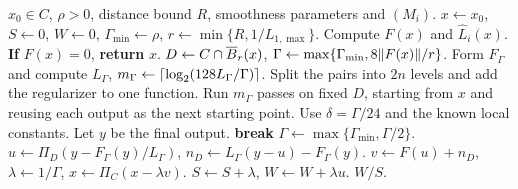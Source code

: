 \begin{algorithm}[htbp]
\caption{Локализованный HPE с внутренним проходом пути А}
\label{alg:hpe}
\begin{algorithmic}[1]
\REQUIRE $x_0\in C$, $\rho>0$, distance bound $R$, smoothness parameters and $(M_i)$.
\STATE $x\gets x_0$, $S\gets0$, $W\gets0$,
  $\Gamma_{\min}\gets\rho$, $r\gets\min\{R,1/L_{1,\max}\}$.
  \STATE Compute $F(x)$ and $\widehat L_i(x)$. \textbf{If} $F(x)=0$, \textbf{return} $x$.
  \STATE $D\gets C\cap\overline B_r(x)$,
     $\Gamma\gets\max\{\Gamma_{\min},8\lVert F(x)\rVert/r\}$.
    \STATE Form $F_\Gamma$ and compute $L_\Gamma$,
       $m_\Gamma\gets\left\lceil \log_2(128L_\Gamma/\Gamma)\right\rceil$.
    \STATE Split the pairs into $2n$ levels and add the regularizer to one function.
    \STATE Run $m_\Gamma$ passes on fixed $D$, starting from $x$ and reusing each output as the next starting point. Use $\delta=\Gamma/24$ and the known local constants. Let $y$ be the final output.
      \STATE \textbf{break}
    \ENDIF
    \STATE $\Gamma\gets\max\{\Gamma_{\min},\Gamma/2\}$.
  \ENDWHILE
  \STATE $u\gets\Pi_D(y-F_\Gamma(y)/L_\Gamma)$,
     $n_D\gets L_\Gamma(y-u)-F_\Gamma(y)$.
  \STATE $v\gets F(u)+n_D$, $\lambda\gets1/\Gamma$,
     $x\gets\Pi_C(x-\lambda v)$.
  \STATE $S\gets S+\lambda$, $W\gets W+\lambda u$.
\ENDWHILE
\RETURN $W/S$.
\end{algorithmic}
\end{algorithm}
